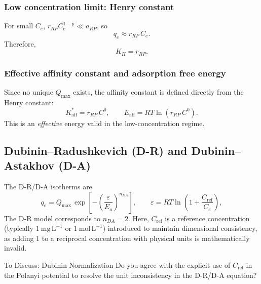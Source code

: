 \documentclass[journal=jacsat,manuscript=article]{achemso}
\begin{document}
\subsubsection{Low concentration limit: Henry constant}

For small $C_e$, $r_{RP}C_e^{1-p} \ll a_{RP}$, so
\begin{equation}
	q_e \approx r_{RP}\, C_e.
\end{equation}
Therefore,
\begin{equation}
	\boxed{K_H = r_{RP}.}
\end{equation}

\subsubsection{Effective affinity constant and adsorption free energy}

Since no unique $Q_{\max}$ exists, the affinity constant is defined directly from the Henry constant:
\begin{equation}
	\boxed{
		K_{\mathrm{aff}}^{\ast} = r_{RP}\, C^0,
		\qquad
		E_{\mathrm{aff}} = RT\ln(r_{RP}\, C^0).
	}
\end{equation}
This is an \emph{effective} energy valid in the low-concentration regime.

\subsection{Dubinin--Radushkevich (D-R) and Dubinin--Astakhov (D-A)}
\label{sec:si_dr_da}

The D-R/D-A isotherms are
\begin{equation}
	q_e = Q_{\max}\,\exp\!\left[-\left(\frac{\varepsilon}{E_a}\right)^{n_{DA}}\right],
	\qquad
	\varepsilon = RT\ln\!\left(1 + \frac{C_{\mathrm{ref}}}{C_e}\right),
	\label{eq:si_dr_da}
\end{equation}
The D-R model corresponds to $n_{DA} = 2$.
Here, $C_{\mathrm{ref}}$ is a reference concentration (typically $1~\mathrm{mg\,L^{-1}}$ or $1~\mathrm{mol\,L^{-1}}$) introduced to maintain dimensional consistency, as adding $1$ to a reciprocal concentration with physical units is mathematically invalid.

\begin{bluebox}{To Discuss: Dubinin Normalization}
Do you agree with the explicit use of $C_{\mathrm{ref}}$ in the Polanyi potential to resolve the unit inconsistency in the D-R/D-A equation?
\end{bluebox}
\end{document}
